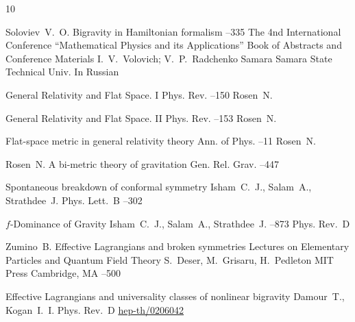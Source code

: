 \begin{thebibliography}{10}

\by Soloviev~V.~O.
\paper Bigravity in Hamiltonian formalism
--335
\inbook  The 4nd International Conference ``Mathematical Physics and its Applications''
\bookinfo Book of Abstracts and Conference Materials
\eds I.~V.~Volovich; V.~P.~Radchenko
\publaddr Samara
\publ Samara State Technical Univ.
\lang In Russian



\paper General Relativity and Flat Space. I
\jour Phys. Rev.
--150
\by Rosen~N.

\paper General Relativity and Flat Space. II
\jour Phys. Rev.
--153
\by Rosen~N.

\paper Flat-space metric in general relativity theory
\jour Ann. of Phys.
--11 
\by Rosen~N.

\by Rosen~N.
\paper A bi-metric theory of gravitation
\jour Gen. Rel. Grav.
--447 


\paper Spontaneous breakdown of conformal symmetry
\by Isham~C.~J., Salam~A., Strathdee~J. 
\jour Phys. Lett.~B
--302 

\paper $f$-Dominance of Gravity
\by Isham~C.~J., Salam~A., Strathdee~J. 
--873
\jour Phys. Rev.~D

\by  Zumino~B.
\paper Effective Lagrangians and broken symmetries
\inbook Lectures on Elementary Particles and Quantum Field Theory
\eds S.~Deser, M.~Grisaru, H.~Pedleton
\publ MIT Press
\publaddr Cambridge, MA
--500

\paper Effective Lagrangians and universality classes of nonlinear bigravity
\by Damour~T., Kogan~I.~I.
\jour Phys. Rev.~D 
\arxiv \href{http://arxiv.org/abs/hep-th/0206042}{hep-th/0206042}


\end{thebibliography}
